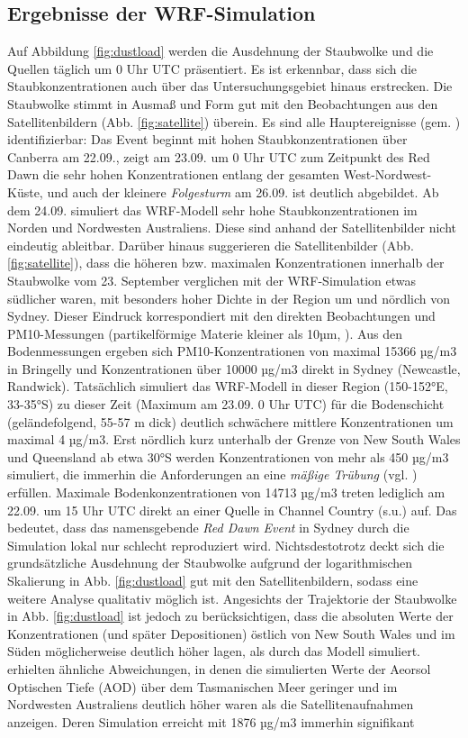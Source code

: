 \documentclass[12pt,a4paper,onecolumn,headheight=30pt]{scrartcl}
\begin{document}
\subsection{Ergebnisse der WRF-Simulation} \label{sec:wrf_results}
Auf Abbildung \ref{fig:dustload} werden die Ausdehnung der Staubwolke und die Quellen täglich um 0 Uhr UTC präsentiert. Es ist erkennbar, dass sich die Staubkonzentrationen auch über das Untersuchungsgebiet hinaus erstrecken. Die Staubwolke stimmt in Ausmaß und Form gut mit den Beobachtungen aus den Satellitenbildern (Abb. \ref{fig:satellite}) überein. Es sind alle Hauptereignisse (gem. \cite{Leys.2009}) identifizierbar: Das Event beginnt mit hohen Staubkonzentrationen über Canberra am 22.09., zeigt am 23.09. um 0 Uhr UTC zum Zeitpunkt des Red Dawn die sehr hohen Konzentrationen entlang der gesamten West-Nordwest-Küste, und auch der kleinere \textit{Folgesturm} am 26.09. ist deutlich abgebildet. Ab dem 24.09. simuliert das WRF-Modell sehr hohe Staubkonzentrationen im Norden und Nordwesten Australiens. Diese sind anhand der Satellitenbilder nicht eindeutig ableitbar. Darüber hinaus suggerieren die Satellitenbilder (Abb. \ref{fig:satellite}), dass die höheren bzw. maximalen Konzentrationen innerhalb der Staubwolke vom 23. September verglichen mit der WRF-Simulation etwas südlicher waren, mit besonders hoher Dichte in der Region um und nördlich von Sydney. Dieser Eindruck korrespondiert mit den direkten Beobachtungen und PM10-Messungen (partikelförmige Materie kleiner als 10µm, \cite{Leys.2011}). Aus den Bodenmessungen ergeben sich PM10-Konzentrationen von maximal 15366 µg/m3 in Bringelly und Konzentrationen über 10000 µg/m3 direkt in Sydney (Newcastle, Randwick). Tatsächlich simuliert das WRF-Modell in dieser Region (150-152°E, 33-35°S) zu dieser Zeit (Maximum am 23.09. 0 Uhr UTC) für die Bodenschicht (geländefolgend, 55-57 m dick) deutlich schwächere mittlere Konzentrationen um maximal 4 µg/m3. Erst nördlich kurz unterhalb der Grenze von New South Wales und Queensland ab etwa 30°S werden Konzentrationen von mehr als 450 µg/m3 simuliert, die immerhin die Anforderungen an eine \textit{mäßige Trübung} (vgl. \cite{Leys.2011}) erfüllen. Maximale Bodenkonzentrationen von 14713 µg/m3 treten lediglich am 22.09. um 15 Uhr UTC direkt an einer Quelle in Channel Country (s.u.) auf. Das bedeutet, dass das namensgebende \textit{Red Dawn Event} in Sydney durch die Simulation lokal nur schlecht reproduziert wird. Nichtsdestotrotz deckt sich die grundsätzliche Ausdehnung der Staubwolke aufgrund der logarithmischen Skalierung in Abb. \ref{fig:dustload} gut mit den Satellitenbildern, sodass eine weitere Analyse qualitativ möglich ist. Angesichts der Trajektorie der Staubwolke in Abb. \ref{fig:dustload} ist jedoch zu berücksichtigen, dass die absoluten Werte der Konzentrationen (und später Depositionen) östlich von New South Wales und im Süden möglicherweise deutlich höher lagen, als durch das Modell simuliert. \citet{AlizadehChoobari.2012} erhielten ähnliche Abweichungen, in denen die simulierten Werte der Aeorsol Optischen Tiefe (AOD) über dem Tasmanischen Meer geringer und im Nordwesten Australiens deutlich höher waren als die Satellitenaufnahmen anzeigen. Deren Simulation erreicht mit 1876 µg/m3 immerhin signifikant 
\end{document}
